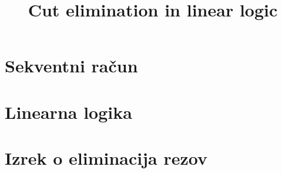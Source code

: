 \documentclass[mat1, tisk]{fmfdelo}
\title{Cut elimination in linear logic}
\begin{document}

\section{Sekventni račun} \label{seq_calc}


\section{Linearna logika}


\section{Izrek o eliminacija rezov}


\end{document}

